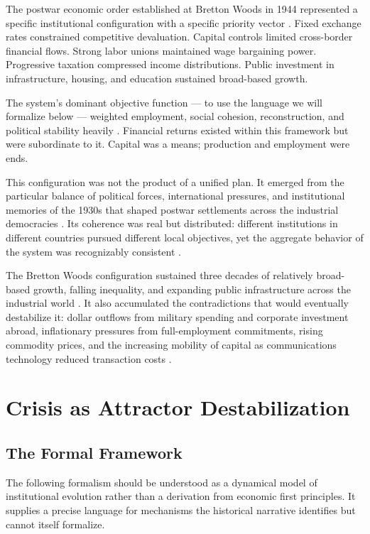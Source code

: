 \documentclass[12pt, a4paper]{article}
\theoremstyle{named}
\begin{document}
The postwar economic order established at Bretton Woods in 1944
represented a specific institutional configuration with a specific
priority vector \cite{polanyi1944,galbraith1967}. Fixed exchange rates
constrained competitive devaluation. Capital controls limited
cross-border financial flows. Strong labor unions maintained wage
bargaining power. Progressive taxation compressed income distributions.
Public investment in infrastructure, housing, and education sustained
broad-based growth.

The system's dominant objective function — to use the language we will
formalize below — weighted employment, social cohesion, reconstruction,
and political stability heavily \cite{minsky1986}. Financial returns
existed within this framework but were subordinate to it. Capital was a
means; production and employment were ends.

This configuration was not the product of a unified plan. It emerged
from the particular balance of political forces, international pressures,
and institutional memories of the 1930s that shaped postwar settlements
across the industrial democracies \cite{polanyi1944,streeck2016}. Its
coherence was real but distributed: different institutions in different
countries pursued different local objectives, yet the aggregate behavior
of the system was recognizably consistent \cite{rodrik2011}.

The Bretton Woods configuration sustained three decades of relatively
broad-based growth, falling inequality, and expanding public
infrastructure across the industrial world \cite{piketty2014}. It also
accumulated the contradictions that would eventually destabilize it:
dollar outflows from military spending and corporate investment abroad,
inflationary pressures from full-employment commitments, rising commodity
prices, and the increasing mobility of capital as communications
technology reduced transaction costs \cite{harvey2005,dumenil2004}.

\section{Crisis as Attractor Destabilization}

\subsection{The Formal Framework}

The following formalism should be understood as a dynamical model of
institutional evolution rather than a derivation from economic first
principles. It supplies a precise language for mechanisms the historical
narrative identifies but cannot itself formalize.
\end{document}
